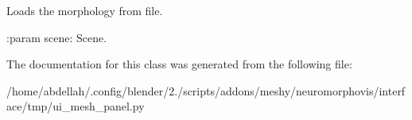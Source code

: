 \begin{DoxyVerb}Loads the morphology from file.

:param scene: Scene.
\end{DoxyVerb}
 

The documentation for this class was generated from the following file\+:\begin{DoxyCompactItemize}
\item 
/home/abdellah/.\+config/blender/2./scripts/addons/meshy/neuromorphovis/interface/tmp/ui\+\_\+mesh\+\_\+panel.\+py\end{DoxyCompactItemize}
